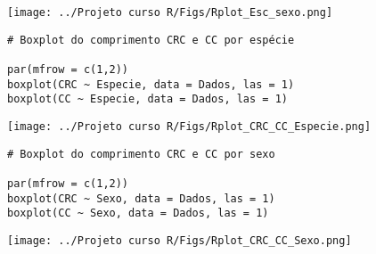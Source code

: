 \documentclass[
]{article}
\begin{document}
\texttt{[image: ../Projeto curso R/Figs/Rplot\_Esc\_sexo.png]}

\begin{verbatim}
# Boxplot do comprimento CRC e CC por espécie

par(mfrow = c(1,2))
boxplot(CRC ~ Especie, data = Dados, las = 1)
boxplot(CC ~ Especie, data = Dados, las = 1)
\end{verbatim}

\texttt{[image: ../Projeto curso R/Figs/Rplot\_CRC\_CC\_Especie.png]}

\begin{verbatim}
# Boxplot do comprimento CRC e CC por sexo

par(mfrow = c(1,2))
boxplot(CRC ~ Sexo, data = Dados, las = 1)
boxplot(CC ~ Sexo, data = Dados, las = 1)
\end{verbatim}

\texttt{[image: ../Projeto curso R/Figs/Rplot\_CRC\_CC\_Sexo.png]}
\end{document}
